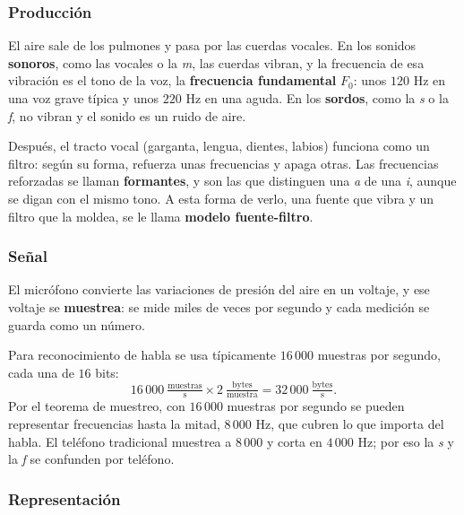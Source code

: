 \documentclass[11pt,letterpaper]{article}
\begin{document}
\subsubsection*{Producción}

El aire sale de los pulmones y pasa por las cuerdas vocales. En los
sonidos \textbf{sonoros}, como las vocales o la \textit{m}, las cuerdas
vibran, y la frecuencia de esa vibración es el tono de la voz, la
\textbf{frecuencia fundamental} $F_0$: unos $120$ Hz en una voz grave
típica y unos $220$ Hz en una aguda. En los \textbf{sordos}, como la
\textit{s} o la \textit{f}, no vibran y el sonido es un ruido de aire.

Después, el tracto vocal (garganta, lengua, dientes, labios) funciona
como un filtro: según su forma, refuerza unas frecuencias y apaga
otras. Las frecuencias reforzadas se llaman \textbf{formantes}, y son
las que distinguen una \textit{a} de una \textit{i}, aunque se digan
con el mismo tono. A esta forma de verlo, una fuente que vibra y un
filtro que la moldea, se le llama \textbf{modelo fuente-filtro}.

\subsubsection*{Señal}

El micrófono convierte las variaciones de presión del aire en un
voltaje, y ese voltaje se \textbf{muestrea}: se mide miles de veces por
segundo y cada medición se guarda como un número.

\begin{ejemplo}
    Para reconocimiento de habla se usa típicamente $16\,000$ muestras
    por segundo, cada una de $16$ bits:
    \[
        16\,000 \ \tfrac{\text{muestras}}{\text{s}}
        \times 2 \ \tfrac{\text{bytes}}{\text{muestra}}
        = 32\,000 \ \tfrac{\text{bytes}}{\text{s}} .
    \]
    Por el teorema de muestreo, con $16\,000$ muestras por segundo se
    pueden representar frecuencias hasta la mitad, $8\,000$ Hz, que
    cubren lo que importa del habla. El teléfono tradicional muestrea a
    $8\,000$ y corta en $4\,000$ Hz; por eso la \textit{s} y la
    \textit{f} se confunden por teléfono.
\end{ejemplo}

\subsubsection*{Representación}
\end{document}
